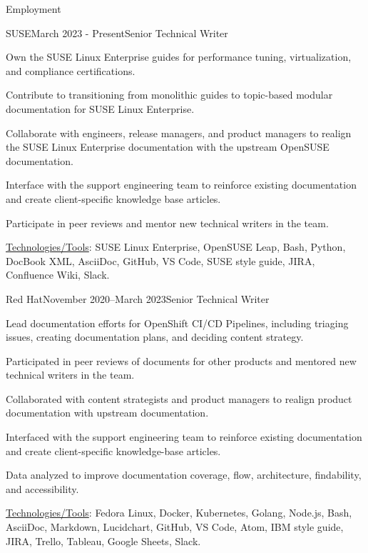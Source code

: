 \documentclass{resume} %
\begin{document}
\begin{rSection}{Employment}

\begin{rSubsection}{SUSE}{March 2023 - Present}{Senior Technical Writer}{}
\item Own the SUSE Linux Enterprise guides for performance tuning, virtualization, and compliance certifications.
\item Contribute to transitioning from monolithic guides to topic-based modular documentation for SUSE Linux Enterprise.
\item Collaborate with engineers, release managers, and product managers to realign the SUSE Linux Enterprise documentation with the upstream OpenSUSE documentation.
\item Interface with the support engineering team to reinforce existing documentation and create client-specific knowledge base articles.
\item Participate in peer reviews and mentor new technical writers in the team. 
\item \underline{Technologies/Tools}: SUSE Linux Enterprise, OpenSUSE Leap, Bash, Python, DocBook XML, AsciiDoc, GitHub, VS Code, SUSE style guide, JIRA, Confluence Wiki, Slack. 
\end{rSubsection}

\begin{rSubsection}{Red Hat}{November 2020–March 2023}{Senior Technical Writer}{}
\item Lead documentation efforts for OpenShift CI/CD Pipelines, including triaging issues, creating documentation plans, and deciding content strategy.
\item Participated in peer reviews of documents for other products and mentored new technical writers in the team. 
\item Collaborated with content strategists and product managers to realign product documentation with upstream documentation.
\item Interfaced with the support engineering team to reinforce existing documentation and create client-specific knowledge-base articles.
\item Data analyzed to improve documentation coverage, flow, architecture, findability, and accessibility. 
\item \underline{Technologies/Tools}: Fedora Linux, Docker, Kubernetes, Golang, Node.js, Bash, AsciiDoc, Markdown, Lucidchart, GitHub, VS Code, Atom, IBM style guide, JIRA, Trello, Tableau, Google Sheets, Slack. 
\end{rSubsection}


\end{rSection}
\end{document}
